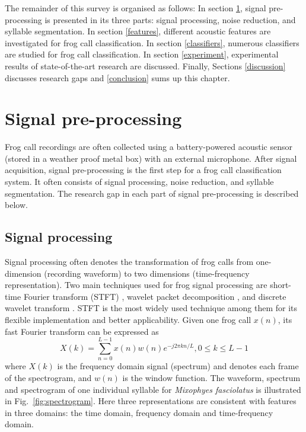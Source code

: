 

The remainder of this survey is organised as follows: In section \ref{pre-processing}, signal pre-processing is presented in its three parts: signal processing, noise reduction, and syllable segmentation. 
In section \ref{features}, different acoustic features are investigated for frog call classification. In section \ref{classifiers}, numerous classifiers are studied for frog call classification. In section \ref{experiment}, experimental results of state-of-the-art research are discussed. Finally, Sections \ref{discussion} discusses research gaps and \ref{conclusion} sums up this chapter.




\section{Signal pre-processing}
\label{pre-processing}

Frog call recordings are often collected using a battery-powered acoustic sensor (stored in a weather proof metal box) with an external microphone. After signal acquisition,  signal pre-processing is the first step for a frog call classification system.
It often consists of signal processing, noise reduction, and syllable segmentation. The research gap in each part of signal pre-processing is described below.


\subsection{Signal processing}
Signal processing often denotes the transformation of frog calls from one-dimension (recording waveform) to two dimensions (time-frequency representation). Two main techniques used for frog signal processing are short-time Fourier transform (STFT) \citep{huang2009frog, Huang20141, Colonna20157367,  Noda2016100}, wavelet packet decomposition \citep{yen2002automatic}, and discrete wavelet transform \citep{colonna2012feature}. STFT is the most widely used technique among them for its flexible implementation and better applicability. Given one frog call $x(n)$, its fast Fourier transform can be expressed as
\begin{equation}
X(k) = \sum_{n=0}^{L-1}x(n)w(n)e^{-j2 \pi kn/L}, 0 \leq k \leq L-1
\end{equation}
where $X(k)$ is the frequency domain signal (spectrum) and denotes each frame of the spectrogram, and $w(n)$ is the window function. The waveform, spectrum and spectrogram of one individual syllable for \textit{Mixophyes fasciolatus} is illustrated in Fig.~\ref{fig:spectrogram}. Here three representations are consistent with features in three domains: the time domain, frequency domain and time-frequency domain.


